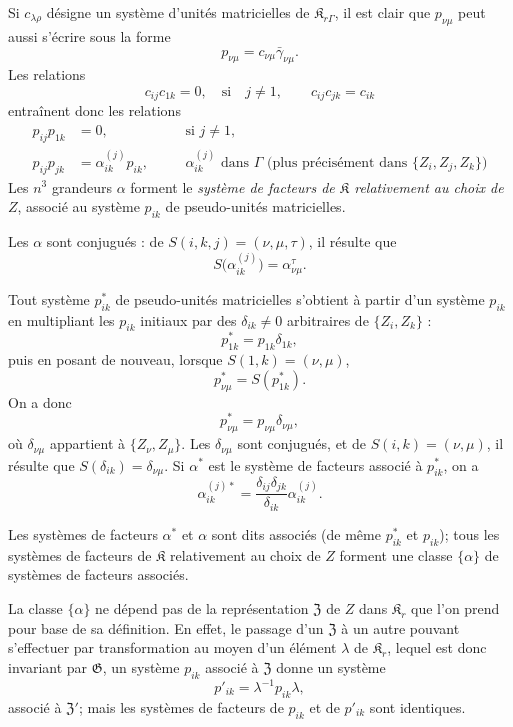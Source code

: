 Si \(c_{\lambda\rho}\) désigne un système d'unités matricielles de \(\mathfrak K_{r\Gamma}\), il est clair que \(p_{\nu\mu}\) peut aussi s'écrire sous la forme
\[
p_{\nu\mu}=c_{\nu\mu}\bar\gamma_{\nu\mu}.
\]
Les relations
\[
c_{ij}c_{1k}=0,\quad\text{si}\quad j\ne1,
\qquad
c_{ij}c_{jk}=c_{ik}
\]
entraînent donc les relations
\[
\begin{aligned}
p_{ij}p_{1k}&=0,\quad &&\text{si }j\ne1,\\
p_{ij}p_{jk}&=\alpha_{ik}^{(j)}p_{ik},\quad
&&\alpha_{ik}^{(j)}\text{ dans }\Gamma\text{ (plus précisément dans }\{Z_i,Z_j,Z_k\}\text{)}
\end{aligned}
\]
Les \(n^3\) grandeurs \(\alpha\) forment le \emph{système de facteurs de \(\mathfrak K\) relativement au choix de \(Z\)}, associé au système \(p_{ik}\) de \og pseudo-unités matricielles\fg{}.

Les \(\alpha\) sont conjugués : de \(S(i,k,j)=(\nu,\mu,\tau)\), il résulte que
\[
S\bigl(\alpha_{ik}^{(j)}\bigr)=\alpha_{\nu\mu}^{\tau}.
\]

Tout système \(p_{ik}^*\) de pseudo-unités matricielles s'obtient à partir d'un système \(p_{ik}\) en multipliant les \(p_{ik}\) initiaux par des \(\delta_{ik}\ne0\) arbitraires de \(\{Z_i,Z_k\}\) :
\[
p_{1k}^*=p_{1k}\delta_{1k},
\]
puis en posant de nouveau, lorsque \(S(1,k)=(\nu,\mu)\),
\[
p_{\nu\mu}^*=S(p_{1k}^*).
\]
On a donc
\[
p_{\nu\mu}^*=p_{\nu\mu}\delta_{\nu\mu},
\]
où \(\delta_{\nu\mu}\) appartient à \(\{Z_\nu,Z_\mu\}\). Les \(\delta_{\nu\mu}\) sont conjugués, et de \(S(i,k)=(\nu,\mu)\), il résulte que \(S(\delta_{ik})=\delta_{\nu\mu}\). Si \(\alpha^*\) est le système de facteurs associé à \(p_{ik}^*\), on a
\[
\alpha_{ik}^{(j)*}=\frac{\delta_{ij}\delta_{jk}}{\delta_{ik}}\alpha_{ik}^{(j)}.
\]

Les systèmes de facteurs \(\alpha^*\) et \(\alpha\) sont dits associés (de même \(p_{ik}^*\) et \(p_{ik}\)); tous les systèmes de facteurs de \(\mathfrak K\) relativement au choix de \(Z\) forment une classe \(\{\alpha\}\) de systèmes de facteurs associés.

La classe \(\{\alpha\}\) ne dépend pas de la représentation \(\mathfrak Z\) de \(Z\) dans \(\mathfrak K_r\) que l'on prend pour base de sa définition. En effet, le passage d'un \(\mathfrak Z\) à un autre pouvant s'effectuer par transformation au moyen d'un élément \(\lambda\) de \(\mathfrak K_r\), lequel est donc invariant par \(\mathfrak G\), un système \(p_{ik}\) associé à \(\mathfrak Z\) donne un système
\[
p'_{ik}=\lambda^{-1}p_{ik}\lambda,
\]
associé à \(\mathfrak Z'\); mais les systèmes de facteurs de \(p_{ik}\) et de \(p'_{ik}\) sont identiques.

